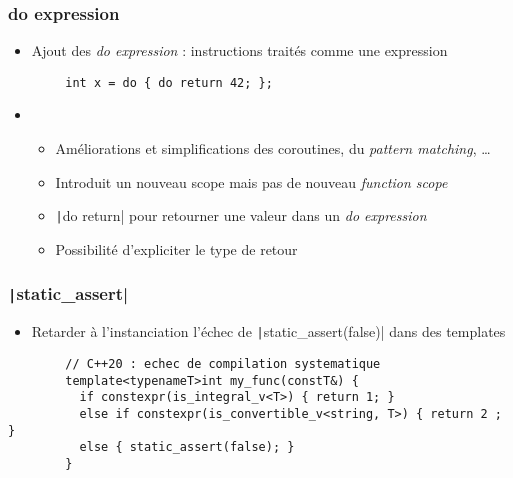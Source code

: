 \documentclass[C++.tex]{subfiles}
\begin{document}
\begin{frame}[fragile]
	\frametitle{do expression}
	\begin{itemize}
		\item Ajout des \textit{do expression} : instructions traités comme une expression
	\end{itemize}

	\begin{verbatim}
		int x = do { do return 42; };
	\end{verbatim}

	\begin{itemize}
		\item[]
		\begin{itemize}
			\item Améliorations et simplifications des coroutines, du \textit{pattern matching}, \ldots{}
			\item Introduit un nouveau scope mais pas de nouveau \textit{function scope}
			\item \texttt|do return| pour retourner une valeur dans un \textit{do expression}
			\item Possibilité d'expliciter le type de retour
		\end{itemize}
	\end{itemize}

\end{frame}

\begin{frame}[fragile]
	\frametitle{\texttt|static_assert|}
	\begin{itemize}
		\item Retarder à l'instanciation l'échec de \texttt|static_assert(false)| dans des templates
	\end{itemize}

	\begin{verbatim}
		// C++20 : echec de compilation systematique
		template<typenameT>int my_func(constT&) {
		  if constexpr(is_integral_v<T>) { return 1; }
		  else if constexpr(is_convertible_v<string, T>) { return 2 ; }
		  else { static_assert(false); }
		}
	\end{verbatim}

\end{frame}
\end{document}

